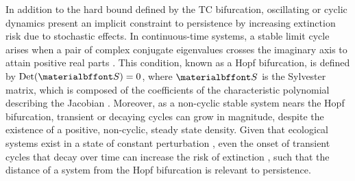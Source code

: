 \documentclass{pnastwo}
\begin{document}
\begin{article}
In addition to the hard bound defined by the TC bifurcation, oscillating or cyclic dynamics present an implicit constraint to persistence by increasing extinction risk due to stochastic effects.
In continuous-time systems, a stable limit cycle arises when a pair of complex conjugate eigenvalues crosses the imaginary axis to attain positive real parts \cite{GuckHolmes}.
This condition, known as a Hopf bifurcation, is defined by ${\rm Det}({\bf S}) = 0$, where $\bf S$ is the Sylvester matrix, which is composed of the coefficients of the characteristic polynomial describing the Jacobian \cite{Gross:2004p2428}.
Moreover, as a non-cyclic stable system nears the Hopf bifurcation, transient or decaying cycles can grow in magnitude, despite the existence of a positive, non-cyclic, steady state density.
Given that ecological systems exist in a state of constant perturbation \cite{Hastings:2001jh}, even the onset of transient cycles that decay over time can increase the risk of extinction \cite{Neubert:1997wk,Caswell:2005eo,Neubert:2009td}, such that the distance of a system from the Hopf bifurcation is relevant to persistence.









\end{article}
\end{document}
